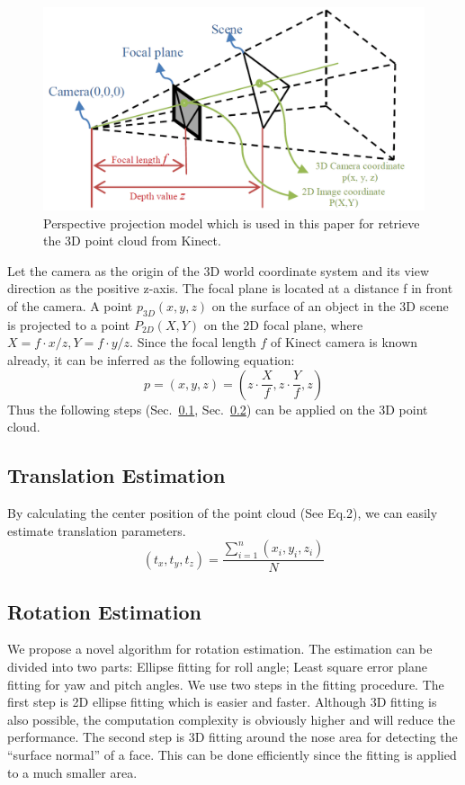 \begin{figure}
\includegraphics[width=1.0\linewidth]{./fig5.png}
\caption{Perspective projection model which is used in this paper for retrieve the 3D point cloud from Kinect.}
\label{fig:5}       %
\end{figure}

Let the camera as the origin of the 3D world coordinate system and its view direction as the positive z-axis. The focal plane is located at a distance f in front of the camera. A point $p_{3D}(x, y, z)$ on the surface of an object in the 3D scene is projected to a point $P_{2D}(X, Y)$ on the 2D focal plane, where $X=f\cdot x/z, Y=f\cdot y/z$. Since the focal length $f$ of Kinect camera is known already, it can be inferred as the following equation:
\begin{equation}
p=(x,y,z)=(z\cdot \frac{X}{f}, z\cdot \frac{Y}{f}, z)
\end{equation}
Thus the following steps (Sec.~\ref{subsec:Translation}, Sec.~\ref{subsec:Rotation}) can be applied on the 3D point cloud.

\subsection{Translation Estimation}
\label{subsec:Translation}
By calculating the center position of the point cloud (See Eq.2), we can easily estimate translation parameters.
\begin{equation}
(t_{x},t_{y},t_{z})=\frac{\sum_{i=1}^n{(x_{i},y_{i},z_{i})}}{N}
\end{equation}

\subsection{Rotation Estimation}
\label{subsec:Rotation}
We propose a novel algorithm for rotation estimation. The estimation can be divided into two parts: Ellipse fitting for roll angle; Least square error plane fitting for yaw and pitch angles. We use two steps in the fitting procedure. The first step is 2D ellipse fitting which is easier and faster. Although 3D fitting is also possible, the computation complexity is obviously higher and will reduce the performance.  The second step is 3D fitting around the nose area for detecting the “surface normal” of a face. This can be done efficiently since  the fitting is applied to a much smaller area.


